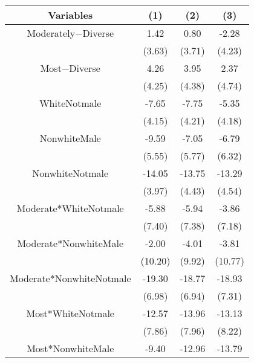 \begin{table}[htbp]
    \begin{tabular}{c c c c}
    \toprule
    \textbf{Variables} & \textbf{(1)} & \textbf{(2)} & \textbf{(3)}       \\ 
\midrule
Moderately$-$Diverse        &     1.42            &    0.80                 &  -2.28     \\
                            &     (3.63)          &     (3.71)             &  (4.23) \\
Most$-$Diverse              &     4.26             &     3.95                & 2.37   \\
                            &    (4.25)         &     (4.38)           &  (4.74)  \\
WhiteNotmale          &    -7.65\sym{*}        &    -7.75\sym{*}    &  -5.35  \\
                            &      (4.15)         &    (4.21)             & (4.18)  \\
NonwhiteMale         &       -9.59\sym{*}   &  -7.05                &  -6.79   \\
                            &      (5.55)         &    (5.77)             &  (6.32) \\
NonwhiteNotmale    &  -14.05\sym{***}    &  -13.75\sym{***}      &  -13.29\sym{***} \\
                            &      (3.97)         &    (4.43)              &   (4.54) \\
Moderate*WhiteNotmale    &   -5.88          & -5.94               &  -3.86  \\
                                 &  (7.40)        &   (7.38)             &  (7.18)  \\
Moderate*NonwhiteMale      &   -2.00       &  -4.01                &  -3.81  \\
                                 &  (10.20)       &     (9.92)             &  (10.77)   \\
Moderate*NonwhiteNotmale  &  -19.30\sym{***} & -18.77\sym{***}     &  -18.93\sym{**} \\
                                 &  (6.98)        &     (6.94)             &  (7.31)   \\
Most*WhiteNotmale          &  -12.57\sym{*} &     -13.96\sym{***}     &  -13.13\sym{*}   \\
                                 &  (7.86)        &     (7.96)             &  (8.22)  \\
Most*NonwhiteMale         &   -9.40        &     -12.96\sym{***}     &   -13.79  \\

\end{tabular}
\end{table}
